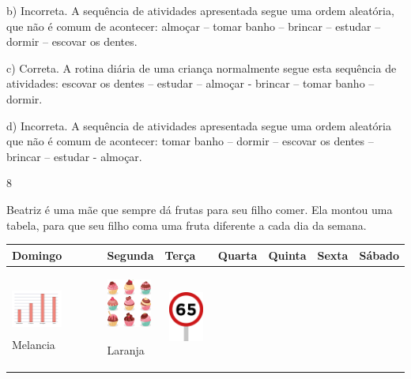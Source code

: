 \begin{escolha}
\begin{escolha}
{{{{b) Incorreta. A sequência de atividades apresentada segue uma ordem
aleatória, que não é comum de acontecer: almoçar -- tomar banho -- brincar
-- estudar -- dormir -- escovar os dentes.

c) Correta. A rotina diária de uma criança normalmente segue esta sequência
de atividades: escovar os dentes -- estudar -- almoçar - brincar -- tomar banho -- dormir.

d) Incorreta. A sequência de atividades apresentada segue uma ordem
aleatória que não é comum de acontecer: tomar banho -- dormir -- escovar
os dentes -- brincar -- estudar - almoçar.

\num{8}

Beatriz é uma mãe que sempre dá frutas para seu filho comer. Ela
montou uma tabela, para que seu filho coma uma fruta diferente a cada
dia da semana.

\begin{longtable}[]{@{}lllllll@{}}
\toprule
Domingo & Segunda & Terça & Quarta & Quinta & Sexta &
Sábado\tabularnewline
\midrule
\endhead
\begin{minipage}[t]{0.14\columnwidth}\raggedright\strut
\includegraphics[width=0.65929in,height=0.64094in]{media/image149.png}Melancia\strut
\end{minipage} & \begin{minipage}[t]{0.14\columnwidth}\raggedright\strut
\includegraphics[width=0.57512in,height=0.64094in]{media/image150.png}

Laranja\strut
\end{minipage} & \begin{minipage}[t]{0.14\columnwidth}\raggedright\strut
\includegraphics[width=0.59540in,height=0.64607in]{media/image151.png}


\end{minipage}
\end{longtable}}}}}
\end{escolha}
\end{escolha}
